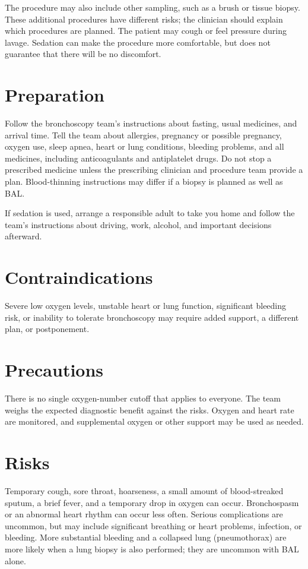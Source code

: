 The procedure may also include other sampling, such as a brush or tissue biopsy. These additional procedures have different risks; the clinician should explain which procedures are planned. The patient may cough or feel pressure during lavage. Sedation can make the procedure more comfortable, but does not guarantee that there will be no discomfort.

\section*{Preparation}
Follow the bronchoscopy team's instructions about fasting, usual medicines, and arrival time. Tell the team about allergies, pregnancy or possible pregnancy, oxygen use, sleep apnea, heart or lung conditions, bleeding problems, and all medicines, including anticoagulants and antiplatelet drugs. Do not stop a prescribed medicine unless the prescribing clinician and procedure team provide a plan. Blood-thinning instructions may differ if a biopsy is planned as well as BAL.

If sedation is used, arrange a responsible adult to take you home and follow the team's instructions about driving, work, alcohol, and important decisions afterward.

\section*{Contraindications}
Severe low oxygen levels, unstable heart or lung function, significant bleeding risk, or inability to tolerate bronchoscopy may require added support, a different plan, or postponement.

\section*{Precautions}
There is no single oxygen-number cutoff that applies to everyone. The team weighs the expected diagnostic benefit against the risks. Oxygen and heart rate are monitored, and supplemental oxygen or other support may be used as needed.

\section*{Risks}
Temporary cough, sore throat, hoarseness, a small amount of blood-streaked sputum, a brief fever, and a temporary drop in oxygen can occur. Bronchospasm or an abnormal heart rhythm can occur less often. Serious complications are uncommon, but may include significant breathing or heart problems, infection, or bleeding. More substantial bleeding and a collapsed lung (pneumothorax) are more likely when a lung biopsy is also performed; they are uncommon with BAL alone.

